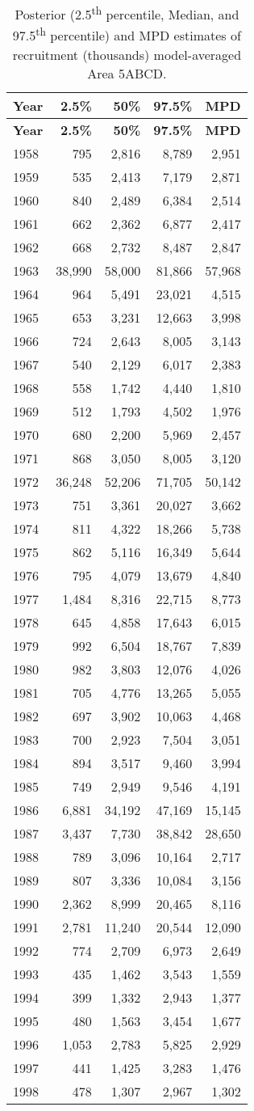 \documentclass[11pt]{book}
\begin{document}
\begin{longtable}[]{@{}lrrrr@{}}
\caption{\label{tab:tab-post-recr-avg-5abcd}Posterior (2.5\textsuperscript{th} percentile, Median, and 97.5\textsuperscript{th} percentile) and MPD estimates of recruitment (thousands) model-averaged Area 5ABCD.}\tabularnewline
\toprule
\textbf{Year} & \textbf{2.5\%} & \textbf{50\%} & \textbf{97.5\%} & \textbf{MPD}\tabularnewline
\midrule
\endfirsthead
\toprule
\textbf{Year} & \textbf{2.5\%} & \textbf{50\%} & \textbf{97.5\%} & \textbf{MPD}\tabularnewline
\midrule
\endhead
1958 & 795 & 2,816 & 8,789 & 2,951\tabularnewline
1959 & 535 & 2,413 & 7,179 & 2,871\tabularnewline
1960 & 840 & 2,489 & 6,384 & 2,514\tabularnewline
1961 & 662 & 2,362 & 6,877 & 2,417\tabularnewline
1962 & 668 & 2,732 & 8,487 & 2,847\tabularnewline
1963 & 38,990 & 58,000 & 81,866 & 57,968\tabularnewline
1964 & 964 & 5,491 & 23,021 & 4,515\tabularnewline
1965 & 653 & 3,231 & 12,663 & 3,998\tabularnewline
1966 & 724 & 2,643 & 8,005 & 3,143\tabularnewline
1967 & 540 & 2,129 & 6,017 & 2,383\tabularnewline
1968 & 558 & 1,742 & 4,440 & 1,810\tabularnewline
1969 & 512 & 1,793 & 4,502 & 1,976\tabularnewline
1970 & 680 & 2,200 & 5,969 & 2,457\tabularnewline
1971 & 868 & 3,050 & 8,005 & 3,120\tabularnewline
1972 & 36,248 & 52,206 & 71,705 & 50,142\tabularnewline
1973 & 751 & 3,361 & 20,027 & 3,662\tabularnewline
1974 & 811 & 4,322 & 18,266 & 5,738\tabularnewline
1975 & 862 & 5,116 & 16,349 & 5,644\tabularnewline
1976 & 795 & 4,079 & 13,679 & 4,840\tabularnewline
1977 & 1,484 & 8,316 & 22,715 & 8,773\tabularnewline
1978 & 645 & 4,858 & 17,643 & 6,015\tabularnewline
1979 & 992 & 6,504 & 18,767 & 7,839\tabularnewline
1980 & 982 & 3,803 & 12,076 & 4,026\tabularnewline
1981 & 705 & 4,776 & 13,265 & 5,055\tabularnewline
1982 & 697 & 3,902 & 10,063 & 4,468\tabularnewline
1983 & 700 & 2,923 & 7,504 & 3,051\tabularnewline
1984 & 894 & 3,517 & 9,460 & 3,994\tabularnewline
1985 & 749 & 2,949 & 9,546 & 4,191\tabularnewline
1986 & 6,881 & 34,192 & 47,169 & 15,145\tabularnewline
1987 & 3,437 & 7,730 & 38,842 & 28,650\tabularnewline
1988 & 789 & 3,096 & 10,164 & 2,717\tabularnewline
1989 & 807 & 3,336 & 10,084 & 3,156\tabularnewline
1990 & 2,362 & 8,999 & 20,465 & 8,116\tabularnewline
1991 & 2,781 & 11,240 & 20,544 & 12,090\tabularnewline
1992 & 774 & 2,709 & 6,973 & 2,649\tabularnewline
1993 & 435 & 1,462 & 3,543 & 1,559\tabularnewline
1994 & 399 & 1,332 & 2,943 & 1,377\tabularnewline
1995 & 480 & 1,563 & 3,454 & 1,677\tabularnewline
1996 & 1,053 & 2,783 & 5,825 & 2,929\tabularnewline
1997 & 441 & 1,425 & 3,283 & 1,476\tabularnewline
1998 & 478 & 1,307 & 2,967 & 1,302\tabularnewline

\end{longtable}
\end{document}
